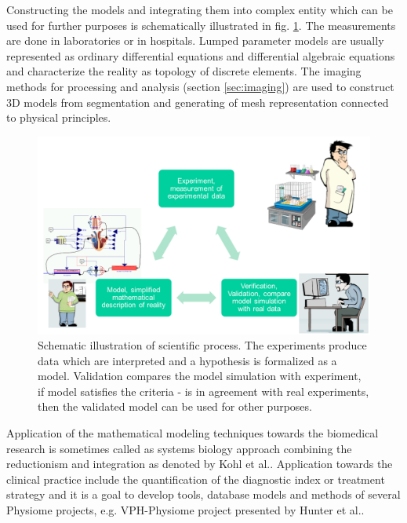 Constructing the models and integrating them into complex entity which can be used for further purposes is schematically illustrated in fig. \ref{fig:modeling}. The measurements are done in laboratories or in hospitals. Lumped parameter models are usually represented as ordinary differential equations and differential algebraic equations and characterize the reality as topology of discrete elements. The imaging methods for processing and analysis (section \ref{sec:imaging}) are used to construct 3D models from segmentation and generating of mesh representation connected to physical principles. 
\begin{figure}[ht]
    \centering
    \includegraphics[width=1\textwidth]{chapter3/modeling.png}
    \caption{Schematic illustration of scientific process. The experiments produce data which are interpreted and a hypothesis is formalized as a model. Validation compares the model simulation with experiment, if model satisfies the criteria - is in agreement with real experiments, then the validated model can be used for other purposes.  %
    }
    \label{fig:modeling}
\end{figure}

Application of the mathematical modeling techniques towards the biomedical research is sometimes called as systems biology approach combining the reductionism and integration as denoted by Kohl et al.\cite{Kohl2010}. Application towards the clinical practice include the quantification of the diagnostic index or treatment strategy and it is a goal to develop tools, database models and methods of several Physiome projects, e.g. VPH-Physiome project presented by Hunter et al.\cite{Hunter2009}.

